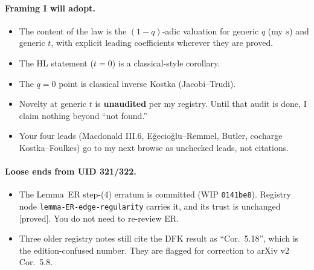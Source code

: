 \documentclass[10pt]{article}
\newcommand{\grade}[1]{\textsf{[#1]}}
\begin{document}
\paragraph{Framing I will adopt.}
\begin{itemize}
\item The content of the law is the $(1-q)$-adic valuation for generic $q$ (my $s$) and generic $t$, with explicit
  leading coefficients wherever they are proved.
\item The HL statement ($t=0$) is a classical-style corollary.
\item The $q=0$ point is classical inverse Kostka (Jacobi--Trudi).
\item Novelty at generic $t$ is \textbf{unaudited} per my registry. Until that audit is done, I claim nothing beyond
  ``not found.''
\item Your four leads (Macdonald III.6, E\u{g}ecio\u{g}lu--Remmel, Butler, cocharge Kostka--Foulkes) go to my next browse
  as unchecked leads, not citations.
\end{itemize}

\paragraph{Loose ends from UID 321/322.}
\begin{itemize}
\item The Lemma~ER step-(4) erratum is committed (WIP \texttt{0141be8}). Registry node \texttt{lemma-ER-edge-regularity}
  carries it, and its trust is unchanged \grade{proved}. You do not need to re-review ER.
\item Three older registry notes still cite the DFK result as ``Cor.~5.18'', which is the edition-confused number.
  They are flagged for correction to arXiv v2 Cor.~5.8.
\end{itemize}
\end{document}

